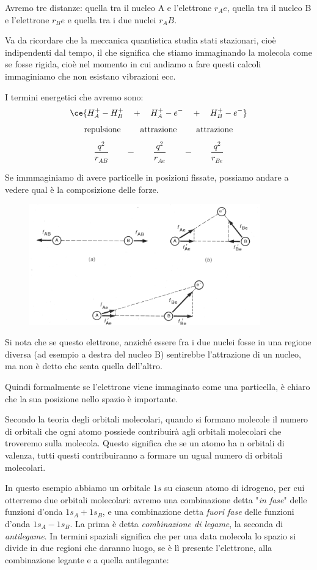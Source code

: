 Avremo tre distanze: quella tra il nucleo A e l'elettrone $r_Ae$, quella tra il nucleo B e l'elettrone $r_Be$ e quella tra i due nuclei $r_AB$.

Va da ricordare che la meccanica quantistica studia stati stazionari, cioè indipendenti dal tempo, il che significa che stiamo immaginando la molecola come se fosse rigida, cioè nel momento in cui andiamo a fare questi calcoli immaginiamo che non esistano vibrazioni ecc.

I termini energetici che avremo sono:
$$\ce{H_A^+-H_B^+ \quad + \quad H_A^+-e^- \quad + \quad H_B^+-e^-}$$
$$\text{repulsione \qquad attrazione \qquad attrazione}$$
$$\frac{q^2}{r_{AB}} \qquad - \qquad \frac{q^2}{r_{Ae}} \qquad - \qquad \frac{q^2}{r_{Be}}$$

Se immmaginiamo di avere particelle in posizioni fissate, possiamo andare a vedere qual è la composizione delle forze.

\begin{figure}[htp]
    \centering
    \includegraphics[width=10cm]{immagini/posizone_elettrone.png}
\end{figure}

Si nota che se questo elettrone, anziché essere fra i due nuclei fosse in una regione diversa (ad esempio a destra del nucleo B) sentirebbe l'attrazione di un nucleo, ma non è detto che senta quella dell'altro.

Quindi formalmente se l'elettrone viene immaginato come una particella, è chiaro che la sua posizione nello spazio è importante.

\vspace{0.2cm}Secondo la teoria degli orbitali molecolari, quando si formano molecole il numero di orbitali che ogni atomo possiede contribuirà agli orbitali molecolari che troveremo sulla molecola. Questo significa che se un atomo ha n orbitali di valenza, tutti questi contribuiranno a formare un ugual numero di orbitali molecolari.

In questo esempio abbiamo un orbitale $1s$ su ciascun atomo di idrogeno, per cui otterremo due orbitali molecolari: avremo una combinazione detta "\textit{in fase}" delle funzioni d'onda $1s_A + 1s_B$, e una combinazione detta  \textit{fuori fase} delle funzioni d'onda $1s_A - 1s_B$. La prima è detta \textit{combinazione di legame}, la seconda di \textit{antilegame}. In termini spaziali significa che per una data molecola lo spazio si divide in due regioni che daranno luogo, se è lì presente l'elettrone, alla combinazione legante e a quella antilegante:

